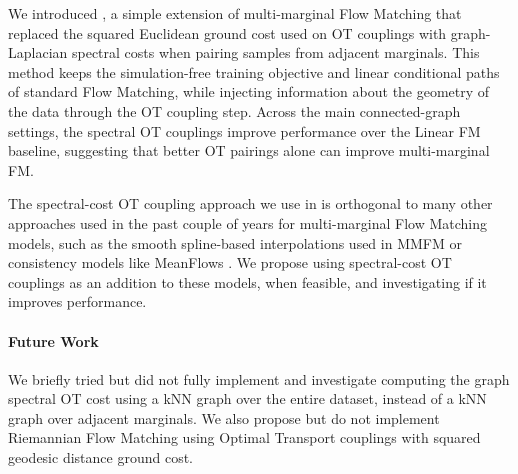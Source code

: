 We introduced \ourmodel, a simple extension of multi-marginal Flow Matching that replaced the squared Euclidean ground cost used on OT couplings with graph-Laplacian spectral costs when pairing samples from adjacent marginals. This method keeps the simulation-free training objective and linear conditional paths of standard Flow Matching, while injecting information about the geometry of the data through the OT coupling step. Across the main connected-graph settings, the spectral OT couplings improve performance over the Linear FM baseline, suggesting that better OT pairings alone can improve multi-marginal FM.

The spectral-cost OT coupling approach we use in \ourmodel is orthogonal to many other approaches used in the past couple of years for multi-marginal Flow Matching models, such as the smooth spline-based interpolations used in MMFM \cite{rohbeckMODELINGCOMPLEXSYSTEM2025} or consistency models like MeanFlows \cite{gengMeanFlowsOnestep2025}. We propose using spectral-cost OT couplings as an addition to these models, when feasible, and investigating if it improves performance.

\paragraph{Future Work} We briefly tried but did not fully implement and investigate computing the graph spectral OT cost using a kNN graph over the entire dataset, instead of a kNN graph over adjacent marginals. We also propose but do not implement Riemannian Flow Matching using Optimal Transport couplings with squared geodesic distance ground cost.